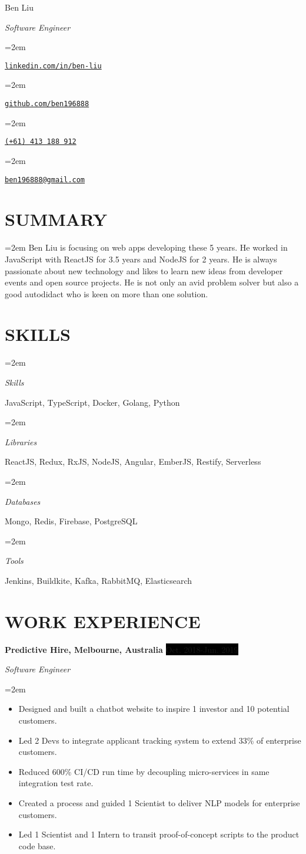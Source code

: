 \documentclass[a4paper, 11pt]{article}
\newlength{\spacebox}
\newcommand{\sepspace}{\vspace*{0.3em}}       %
\newcommand{\MyName}[1]{ %
        \noindent
		\Huge \usefont{OT1}{phv}{b}{n} #1
		\par \normalsize \normalfont}
\newcommand{\MySlogan}[1]{ %
		\noindent
		\large \usefont{OT1}{phv}{m}{n}\textit{#1}
		\par \normalsize \normalfont}
\newcommand{\NewPart}[1]{\section*{\uppercase{#1}}}
\newcommand{\PersonalEntry}[2]{
		\noindent\hangindent=2em\hangafter=0 %
		\parbox{\spacebox}{        %
		\hfill\textit{#1}}		       %
		\hfill\hspace{1.2em} #2 \par}    %
\newcommand{\SummaryEntry}[1]{
		\noindent\hangindent=2em\hangafter=0
		\noindent #1
		\normalsize \par}
\newcommand{\SkillsEntry}[2]{      %
		\noindent\hangindent=2em\hangafter=0 %
		\parbox{\spacebox}{        %
		\textit{#1}}			   %
		\hspace{1.2em} #2 \par}    %
\newcommand{\EducationEntry}[4]{
		\noindent \textbf{#1} \hfill      %
		\colorbox{White}{%
			\parbox{5cm}{%
			\hfill\color{Black}#2}} \par  %
		\noindent \textit{#3} \par        %
		\noindent\hangindent=2em\hangafter=0 \small #4 %
		\normalsize \par}
\newcommand{\WorkEntry}[4]{				  %
		\noindent \textbf{#1} \hfill      %
		\noindent\colorbox{Black}{\color{White}#2} \par  %
		\noindent \textit{#3} \par              %
		\noindent\hangindent=2em\hangafter=0 \small #4 %
		\normalsize \par}
\begin{document}
\parbox{0.35\textwidth}{
	\MyName{Ben Liu}
	\MySlogan{Software Engineer}
}
\parbox{0.6\textwidth}{

\PersonalEntry{}{\href{https://www.linkedin.com/in/ben-liu}{\texttt{linkedin.com/in/ben-liu}}}
\PersonalEntry{}{\href{https://github.com/ben196888}{\texttt{github.com/ben196888}}}
\PersonalEntry{}{\href{tel:+61-413-188-912}{\texttt{(+61) 413 188 912}}}
\PersonalEntry{}{\href{mailto:ben196888@gmail.com}{\texttt{ben196888@gmail.com}}}
}
\sepspace

\NewPart{Summary}{}

\SummaryEntry{%
Ben Liu is focusing on web apps developing these 5 years.
He worked in JavaScript with ReactJS for 3.5 years and NodeJS for 2 years.
He is always passionate about new technology and likes to learn new ideas from developer events and open source projects.
He is not only an avid problem solver but also a good autodidact who is keen on more than one solution.
}

\NewPart{Skills}{}

\SkillsEntry{Skills}    {JavaScript, TypeScript, Docker, Golang, Python}
\SkillsEntry{Libraries} {ReactJS, Redux, RxJS, NodeJS, Angular, EmberJS, Restify, Serverless}
\SkillsEntry{Databases} {Mongo, Redis, Firebase, PostgreSQL}
\SkillsEntry{Tools}     {Jenkins, Buildkite, Kafka, RabbitMQ, Elasticsearch}

\NewPart{Work Experience}{}

\WorkEntry{Predictive Hire, Melbourne, Australia}{Oct. 2018-Jun. 2019}{Software Engineer}{
\begin{itemize}
	\item {Designed and built a chatbot website to inspire 1 investor and 10 potential customers.}
	\item {Led 2 Devs to integrate applicant tracking system to extend 33\% of enterprise customers.}
	\item {Reduced 600\% CI/CD run time by decoupling micro-services in same integration test rate.}
	\item {Created a process and guided 1 Scientist to deliver NLP models for enterprise customers.}
	\item {Led 1 Scientist and 1 Intern to transit proof-of-concept scripts to the product code base.}
\end{itemize}
}
\end{document}
